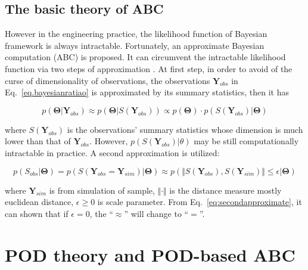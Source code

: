 \documentclass[review]{elsarticle}
\begin{document}
\subsection{The basic theory of ABC}

However in the engineering practice, the likelihood function of Bayesian framework is always intractable. Fortunately, an approximate Bayesian computation (ABC) \cite{pritchard1999population} is proposed. It can circumvent the intractable likelihood function via two steps of approximation \cite{blum2013comparative}. At first step, in order to avoid of the curse of dimensionality of observations, the observations $\mathbf{Y}_{obs}$ in Eq.~\ref{eq.bayesianratiao} is approximated by its summary statistics, then it has

\begin{equation}
\label{eq:firstapproximate}
p(\mathbf{\Theta} | \mathbf{Y}_{obs}) \approx p(\mathbf{\Theta} | S(\mathbf{Y}_{obs})) \propto p(\mathbf{\Theta})\cdot p( S(\mathbf{Y}_{obs}) | \mathbf{\Theta})
\end{equation}

\noindent where $S(\mathbf{Y}_{obs})$ is the observations' summary statistics whose dimension is much lower than that of $\mathbf{Y}_{obs}$. However, $p(S(\mathbf{Y}_{obs}) | \theta)$ may be still computationally intractable in practice. A second approximation is utilized:

\begin{equation}
\label{eq:secondapproximate}
p \left( S_{obs} | \mathbf{\Theta}  \right) = p \left(  S(\mathbf{Y}_{obs} = \mathbf{Y}_{sim})  | \mathbf{\Theta} \right) \approx p \left( \Vert S(\mathbf{Y}_{obs}), S(\mathbf{Y}_{sim}) \Vert \leq \epsilon | \mathbf{\Theta} \right)
\end{equation}

\noindent where $\mathbf{Y}_{sim}$ is from simulation of sample, $\Vert \cdot \Vert$ is the distance measure mostly euclidean distance, $\epsilon \geq 0$ is scale parameter. From Eq.~\ref{eq:secondapproximate}, it can shown that if $\epsilon=0$, the ``$\approx$'' will change to ``$=$''. 

\section{POD theory and  POD-based ABC}
\end{document}

